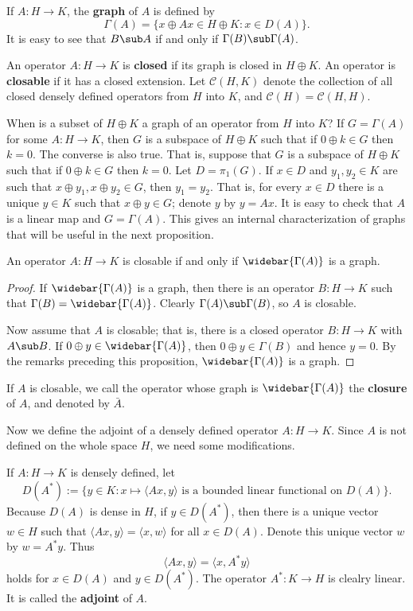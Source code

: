 If $A:H\to K$, the \textbf{graph} of $A$ is defined by
\[\Gamma(A)=\{x\oplus Ax\in H\oplus K:x\in D(A)\}.\]
It is easy to see that $B\sub A$ if and only if $\Gamma(B)\sub\Gamma(A)$.
\begin{definition}
An operator $A:H\to K$ is \textbf{closed} if its graph is closed in $H\oplus K$. An operator is \textbf{closable} if it has a closed extension. Let $\mathcal{C}(H,K)$ denote the collection of all closed densely defined operators from $H$ into $K$, and $\mathcal{C}(H)=\mathcal{C}(H,H)$.
\end{definition}
When is a subset of $H\oplus K$ a graph of an operator from $H$ into $K$? If $G=\Gamma(A)$ for some $A:H\to K$, then $G$ is a subspace of $H\oplus K$ such that if $0\oplus k\in G$ then $k=0$. The converse is also true. That is, suppose that $G$ is a subspace of $H\oplus K$ such that if $0\oplus k\in G$ then $k=0$. Let $D=\pi_1(G)$. If $x\in D$ and $y_1,y_2\in K$ are such that $x\oplus y_1,x\oplus y_2\in G$, then $y_1=y_2$. That is, for every $x\in D$ there is a unique $y\in K$ such that $x\oplus y\in G$; denote $y$ by $y=Ax$. It is easy to check that $A$ is a linear map and $G=\Gamma(A)$. This gives an internal characterization of graphs that will be useful in the next proposition.
\begin{proposition}\label{Hilbert space operator closable iff graph}
An operator $A:H\to K$ is closable if and only if $\widebar{\Gamma(A)}$ is a graph.
\end{proposition}
\begin{proof}
If $\widebar{\Gamma(A)}$ is a graph, then there is an operator $B:H\to K$ such that $\Gamma(B)=\widebar{\Gamma(A)}$. Clearly $\Gamma(A)\sub\Gamma(B)$, so $A$ is closable.\par
Now assume that $A$ is closable; that is, there is a closed operator $B:H\to K$ with $A\sub B$. If $0\oplus y\in\widebar{\Gamma(A)}$, then $0\oplus y\in\Gamma(B)$ and hence $y=0$. By the remarks preceding this proposition, $\widebar{\Gamma(A)}$ is a graph.
\end{proof}
If $A$ is closable, we call the operator whose graph is $\widebar{\Gamma(A)}$ the \textbf{closure} of $A$, and denoted by $\bar{A}$.\par
Now we define the adjoint of a densely defined operator $A:H\to K$. Since $A$ is not defined on the whole space $H$, we need some modifications.
\begin{definition}
If $A:H\to K$ is densely defined, let
\[D(A^*):=\{y\in K:x\mapsto\langle Ax,y\rangle\text{ is a bounded linear functional on $D(A)$}\}.\]
Because $D(A)$ is dense in $H$, if $y\in D(A^*)$, then there is a unique vector $w\in H$ such that $\langle Ax,y\rangle=\langle x,w\rangle$ for all $x\in D(A)$. Denote this unique vector $w$ by $w=A^*y$. Thus
\[\langle Ax,y\rangle=\langle x,A^*y\rangle\]
holds for $x\in D(A)$ and $y\in D(A^*)$. The operator $A^*:K\to H$ is clealry linear. It is called the \textbf{adjoint} of $A$.
\end{definition}
